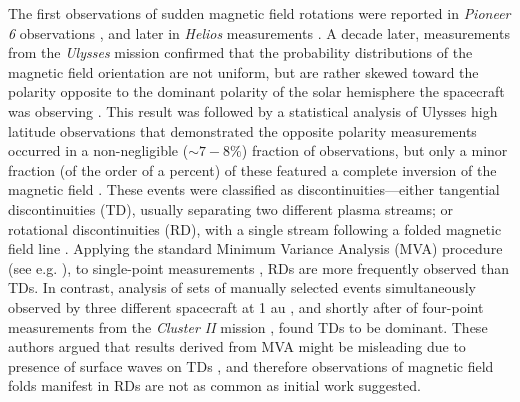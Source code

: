 \documentclass[]{aastex62}
\begin{document}
The first observations of sudden magnetic field rotations were reported in \emph{Pioneer 6} observations \citep{Burlaga_1969_SoPh_B,Burlaga_1971_JGR}, and later in \emph{Helios} measurements \citep{Marsch_1981_JGR}. A decade later, measurements from the \emph{Ulysses} mission confirmed that the probability distributions of the magnetic field orientation are not uniform, but are rather skewed toward the polarity opposite to the dominant polarity of the solar hemisphere the spacecraft was observing \citep{Forsyth_1995_GRL}. This result was followed by a statistical analysis of Ulysses high latitude observations \citep{McComas_1998_GRL} that demonstrated the opposite polarity measurements occurred in a non-negligible ($\sim 7-8\%$) fraction of observations, but only a minor fraction (of the order of a percent) of these featured a complete inversion of the magnetic field \citep{Balogh_1999_GeoRL}. These events were classified as discontinuities---either tangential discontinuities (TD), usually separating two different plasma streams; or rotational discontinuities (RD), with a single stream following a folded magnetic field line \citep{Burlaga_1977_JGR,Neubauer_1981_sowi.conf}. Applying the standard Minimum Variance Analysis (MVA) procedure (see e.g. \cite{Sonnerup_1998_ISSIR}), to single-point measurements \citep{Burlaga_1969_SoPh,Mariani_1973_JGR,Smith_1973_JGR,Neugebauer_1984_JGR,Lepping_1986_JGR}, RDs are more frequently observed than TDs. In contrast, analysis of sets of manually selected events simultaneously observed by three different spacecraft at 1 au \citep{Tsurutani_1979_JGR,Horbury_2001_GRL}, and shortly after of four-point measurements from the \emph{Cluster II} mission \citep{Knetter_2003_AdSpR,Knetter_2004_JGRA}, found TDs to be dominant. These authors argued that results derived from MVA might be misleading due to presence of surface waves on TDs \citep{Denskat_1977_JGR,Hollweg_1982_JGR}, and therefore observations of magnetic field folds manifest in RDs are not as common as initial work suggested.
\end{document}
